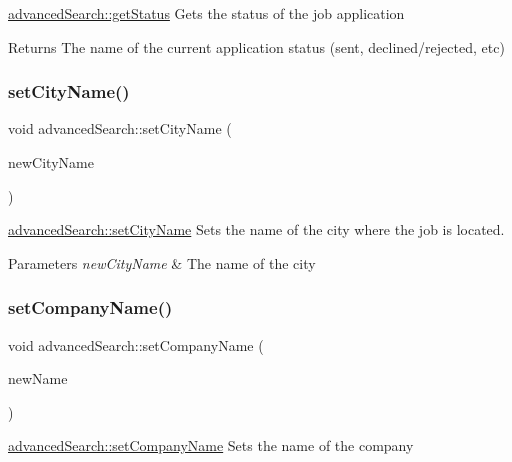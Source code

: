 \mbox{\hyperlink{classadvanced_search_afc318495c6475695844bd0f22c6c1e3c}{advanced\+Search\+::get\+Status}} Gets the status of the job application 

\begin{DoxyReturn}{Returns}
The name of the current application status (sent, declined/rejected, etc) 
\end{DoxyReturn}
\mbox{\label{classadvanced_search_a285bcf54a61d42fa81a7d1a5a86c5779}} 
\subsubsection{\texorpdfstring{set\+City\+Name()}{setCityName()}}
{\footnotesize\ttfamily void advanced\+Search\+::set\+City\+Name (\begin{DoxyParamCaption}\item[{Q\+String}]{new\+City\+Name }\end{DoxyParamCaption})}



\mbox{\hyperlink{classadvanced_search_a285bcf54a61d42fa81a7d1a5a86c5779}{advanced\+Search\+::set\+City\+Name}} Sets the name of the city where the job is located. 


\begin{DoxyParams}{Parameters}
{\em new\+City\+Name} & The name of the city \\
\hline
\end{DoxyParams}
\mbox{\label{classadvanced_search_a6d817d740d8e614bf93cec866735bd7f}} 
\subsubsection{\texorpdfstring{set\+Company\+Name()}{setCompanyName()}}
{\footnotesize\ttfamily void advanced\+Search\+::set\+Company\+Name (\begin{DoxyParamCaption}\item[{Q\+String}]{new\+Name }\end{DoxyParamCaption})}



\mbox{\hyperlink{classadvanced_search_a6d817d740d8e614bf93cec866735bd7f}{advanced\+Search\+::set\+Company\+Name}} Sets the name of the company 


